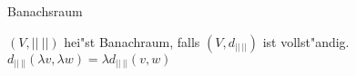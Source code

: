 \documentclass[class=article, crop=false]{standalone}
\begin{document}
\begin{zettel}{Banachsraum}
\begin{flashcard}[]{}
	\begin{definition}[Banachsraum]
		$ (V, ||\ ||)  $ hei"st Banachraum, falls $ (V,d_{||\ ||})  $ ist vollst"andig.
		$d_{ ||\ ||}(\lambda v, \lambda w) = \lambda  d_{ ||\ ||} (v,w) $
	\end{definition}
\end{flashcard}
\end{zettel}
\end{document}
